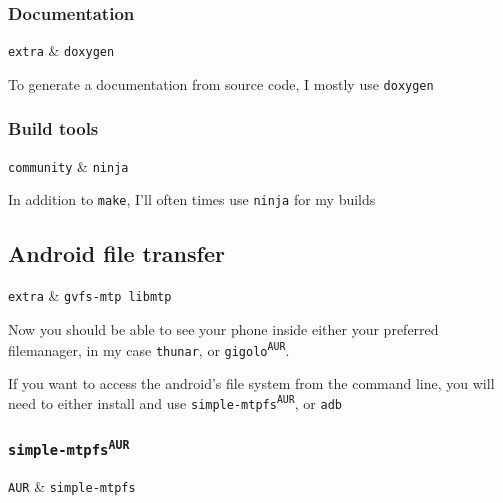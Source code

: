 \documentclass[10pt]{dustdoc}
\begin{document}
\subsubsection{Documentation}
\label{sec:documentation}

\begin{packagetable}
    \texttt{extra} & \texttt{doxygen} \\
\end{packagetable}

To generate a documentation from source code, I mostly use \texttt{doxygen}

\subsubsection{Build tools}
\label{sec:build-tools}

\begin{packagetable}
    \texttt{community} & \texttt{ninja} \\
\end{packagetable}

In addition to \texttt{make}, I’ll often times use \texttt{ninja} for my builds

\subsection{Android file transfer}
\label{sec:android-file-transfer}

\begin{packagetable}
    \texttt{extra} & \texttt{gvfs-mtp libmtp} \\
\end{packagetable}

Now you should be able to see your phone inside either your preferred filemanager, in my case \texttt{thunar}, or \texttt{gigolo\textsuperscript{\texttt{AUR}}}.

If you want to access the android’s file system from the command line, you will need to either install and use \texttt{simple-mtpfs\textsuperscript{\texttt{AUR}}}, or \texttt{adb}

\subsubsection{\texttt{simple-mtpfs\texorpdfstring{\textsuperscript{AUR}}{ (AUR)}}}
\label{sec:simple-mtpfs-aur}

\begin{packagetable}
    \texttt{AUR} & \texttt{simple-mtpfs} \\
\end{packagetable}
\end{document}
